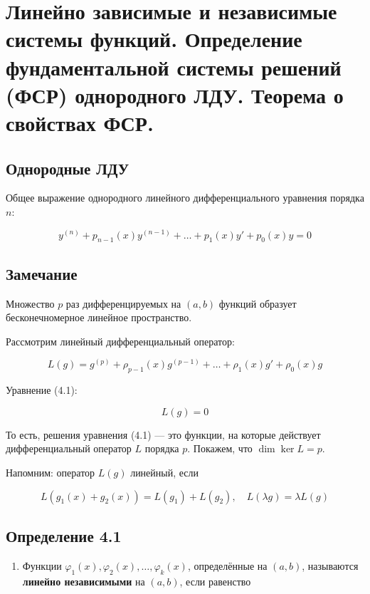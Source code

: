 {
	\section{Линейно зависимые и независимые системы функций. Определение фундаментальной системы решений (ФСР)
	однородного ЛДУ. Теорема о свойствах ФСР.}

	\subsection*{Однородные ЛДУ}

	Общее выражение однородного линейного дифференциального уравнения порядка \( n \):

	\begin{equation}
	y^{(n)} + p_{n-1}(x)y^{(n-1)} + \ldots + p_1(x)y' + p_0(x)y = 0 \tag{4.1}
	\end{equation}

	\subsection*{Замечание}

	Множество \( p \) раз дифференцируемых на \( (a, b) \) функций образует бесконечномерное линейное пространство.

	Рассмотрим линейный дифференциальный оператор:


	\[
	L(g) = g^{(p)} + \rho_{p-1}(x)g^{(p-1)} + \ldots + \rho_1(x)g' + \rho_0(x)g
	\]



	Уравнение (4.1):


	\[
	L(g) = 0
	\]



	То есть, решения уравнения (4.1) — это функции, на которые действует дифференциальный оператор \( L \) порядка \( p \). Покажем, что \( \dim \ker L = p \).

	Напомним: оператор \( L(g) \) линейный, если


	\[
	L(g_1(x) + g_2(x)) = L(g_1) + L(g_2), \quad L(\lambda g) = \lambda L(g)
	\]

	\subsection*{Определение 4.1}

	\begin{enumerate}
	\item Функции \( \varphi_1(x), \varphi_2(x), \ldots, \varphi_k(x) \), определённые на \( (a, b) \), называются \textbf{линейно независимыми} на \( (a, b) \), если равенство
	


\end{enumerate}}
